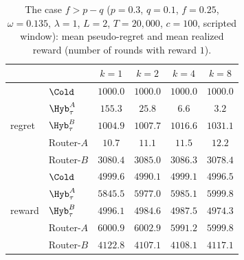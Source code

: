 \begin{table}[h]
\centering
\caption{The case $f>p-q$ ($p=0.3$, $q=0.1$, $f=0.25$, $\omega=0.135$, $\lambda=1$, $L=2$, $T=20{,}000$, $c=100$, scripted window): mean pseudo-regret and mean realized reward (number of rounds with reward $1$).}
\label{tab:router-fgt}
\small
\begin{tabular}{@{}llcccc@{}}
\toprule
 & & $k=1$ & $k=2$ & $k=4$ & $k=8$ \\
\midrule
\multirow{5}{*}{regret} & $\Cold$ & $1000.0$ & $1000.0$ & $1000.0$ & $1000.0$ \\
 & $\Hyb^A_\tau$ & $155.3$ & $25.8$ & $6.6$ & $3.2$ \\
 & $\Hyb^B_\tau$ & $1004.9$ & $1007.7$ & $1016.6$ & $1031.1$ \\
 & Router-$A$ & $10.7$ & $11.1$ & $11.5$ & $12.2$ \\
 & Router-$B$ & $3080.4$ & $3085.0$ & $3086.3$ & $3078.4$ \\
\midrule
\multirow{5}{*}{reward} & $\Cold$ & $4999.6$ & $4990.1$ & $4999.1$ & $4996.5$ \\
 & $\Hyb^A_\tau$ & $5845.5$ & $5977.0$ & $5985.1$ & $5999.8$ \\
 & $\Hyb^B_\tau$ & $4996.1$ & $4984.6$ & $4987.5$ & $4974.3$ \\
 & Router-$A$ & $6000.9$ & $6002.9$ & $5991.2$ & $5999.8$ \\
 & Router-$B$ & $4122.8$ & $4107.1$ & $4108.1$ & $4117.1$ \\
\bottomrule
\end{tabular}
\end{table}

